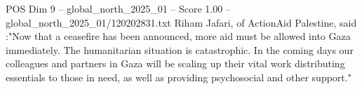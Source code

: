 \begin{textsample}{POS Dim 9 – global\_north\_2025\_01 – Score 1.00 – global\_north\_2025\_01/120202831.txt}
Riham Jafari, of ActionAid Palestine, said :"Now that a ceasefire has been announced, more aid must be allowed into Gaza immediately.
The humanitarian situation is catastrophic.
In the coming days our colleagues and partners in Gaza will be scaling up their vital work distributing essentials to those in need, as well as providing psychosocial and other support."

\end{textsample}
